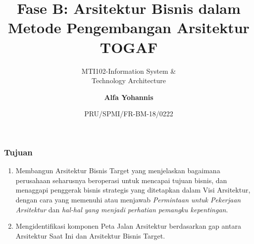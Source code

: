 \documentclass[aspectratio=169, table]{beamer}
\subtitle{MTI102-Information System \&\\Technology Architecture}
\title{Fase B: Arsitektur Bisnis dalam Metode Pengembangan Arsitektur TOGAF}
\date[Serial]{\scriptsize {PRU/SPMI/FR-BM-18/0222}}
\author[Pradita]{\small {\textbf{Alfa Yohannis}}}
\begin{document}
	\frame{\titlepage}

	\begin{frame}
		\frametitle{Tujuan}
		\begin{enumerate}
			\item Membangun Arsitektur Bisnis Target yang menjelaskan bagaimana perusahaan seharusnya beroperasi untuk mencapai tujuan bisnis, dan menaggapi penggerak bisnis strategis yang ditetapkan dalam Visi Arsitektur, dengan cara yang memenuhi atau menjawab \textit{Permintaan untuk Pekerjaan Arsitektur} dan \textit{hal-hal yang menjadi perhatian pemangku kepentingan}.

			\item Mengidentifikasi komponen Peta Jalan Arsitektur berdasarkan gap antara Arsitektur Saat Ini dan Arsitektur Bisnis Target.
		\end{enumerate}
	\end{frame}
\end{document}
